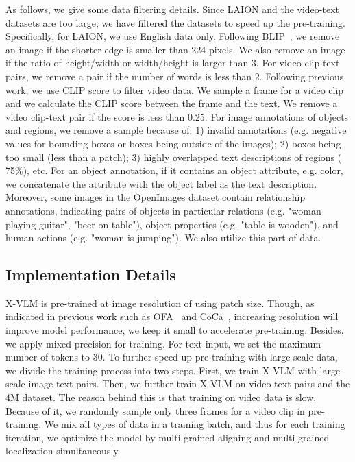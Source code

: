 \documentclass{article}
\newcommand{\baby}{X-VLM\xspace}
\begin{document}
As follows, we give some data filtering details. Since LAION and the video-text datasets are too large, we have filtered the datasets to speed up the pre-training. Specifically, for LAION, we use English data only. Following BLIP~\cite{li2022blip}, we remove an image if the shorter edge is smaller than 224 pixels. We also remove an image if the ratio of height/width or width/height is larger than 3. For video clip-text pairs, we remove a pair if the number of words is less than 2. Following previous work, we use CLIP score to filter video data. We sample a frame for a video clip and we calculate the CLIP score between the frame and the text. We remove a video clip-text pair if the score is less than 0.25. For image annotations of objects and regions, we remove a sample because of: 1) invalid annotations (e.g. negative values for bounding boxes or boxes being outside of the images); 2) boxes being too small (less than a patch); 3) highly overlapped text descriptions of regions ( 75\%), etc. For an object annotation, if it contains an object attribute, e.g. color, we concatenate the attribute with the object label as the text description. Moreover, some images in the OpenImages dataset contain relationship annotations, indicating pairs of objects in particular relations (e.g. "woman playing guitar", "beer on table"), object properties (e.g. "table is wooden"), and human actions (e.g. "woman is jumping"). We also utilize this part of data.  


\subsection{Implementation Details}

\baby is pre-trained at image resolution of  using  patch size. Though, as indicated in previous work such as OFA~\cite{wang2022ofa} and CoCa~\cite{yu2022coca}, increasing resolution will improve model performance, we keep it small to accelerate pre-training. Besides, we apply mixed precision for training. For text input, we set the maximum number of tokens to 30. To further speed up pre-training with large-scale data, we divide the training process into two steps. First, we train \baby with large-scale image-text pairs. Then, we further train \baby on video-text pairs and the 4M dataset. The reason behind this is that training on video data is slow. Because of it, we randomly sample only three frames for a video clip in pre-training. We mix all types of data in a training batch, and thus for each training iteration, we optimize the model by multi-grained aligning and multi-grained localization simultaneously. 
\end{document}
